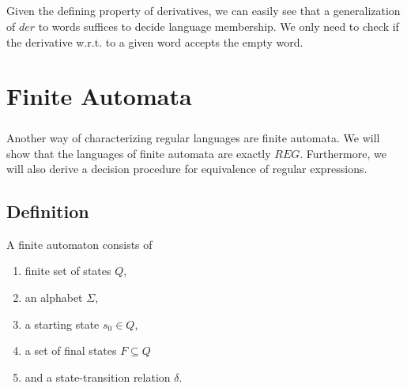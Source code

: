 \documentclass[11pt,a4paper,oneside]{book}
\begin{document}
                \paragraph{} 
                    Given the defining property of derivatives, we can easily see that a generalization of $der$ to words suffices to decide language membership. We only need to check if the derivative w.r.t. to a given word accepts the empty word.


                \begin{theorem}
                    \label{mem_der_correct} 
                    
                \end{theorem}

            

    \chapter{Finite Automata}
        \paragraph{} 
        Another way of characterizing regular languages are finite automata. 
        We will show that the languages of finite automata are exactly $REG$. 
        Furthermore, we will also derive a decision procedure for equivalence of regular expressions.

        \section{Definition}
            A finite automaton consists of
            \begin{enumerate}
                \item
                    finite set of states $Q$, 
                \item 
                    an alphabet $\Sigma$, 
                \item 
                    a starting state $s_0 \in Q$, 
                \item 
                    a set of final states $F \subseteq Q$ 
                \item 
                    and a state-transition relation $\delta$. \cite{DBLP:books/daglib/0011126}
            \end{enumerate}
\end{document}
